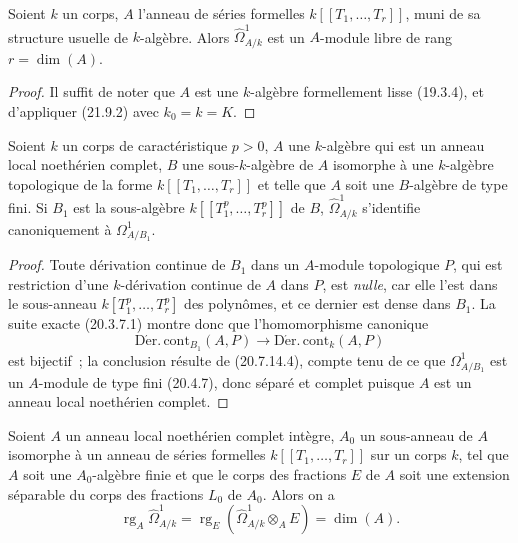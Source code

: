 \begin{corollary}[21.9.3]
\label{0.21.9.3-fr}
Soient $k$ un corps, $A$ l'anneau de séries formelles
$k[[T_1,\ldots,T_r]]$, muni de sa structure usuelle de $k$-algèbre. Alors
$\widehat\Omega^1_{A/k}$ est un $A$-module libre de rang $r=\dim(A)$.
\end{corollary}

\begin{proof}
Il suffit de noter que $A$ est une $k$-algèbre formellement lisse (19.3.4),
et d'appliquer (21.9.2) avec $k_0=k=K$.
\end{proof}

\begin{lemma}[21.9.4]
\label{0.21.9.4-fr}
Soient $k$ un corps de caractéristique $p>0$, $A$ une $k$-algèbre qui est un
anneau local noethérien complet, $B$ une sous-$k$-algèbre de $A$ isomorphe à
une $k$-algèbre topologique de la forme $k[[T_1,\ldots,T_r]]$ et telle que
$A$ soit une $B$-algèbre de type fini. Si $B_1$ est la sous-algèbre
$k[[T_1^p,\ldots,T_r^p]]$ de $B$, $\widehat\Omega^1_{A/k}$ s'identifie
canoniquement à $\Omega^1_{A/B_1}$.
\end{lemma}

\begin{proof}
Toute dérivation continue de $B_1$ dans un $A$-module topologique $P$, qui
est restriction d'une $k$-dérivation continue de $A$ dans $P$, est \emph{nulle},
car elle l'est dans le sous-anneau $k[T_1^p,\ldots,T_r^p]$ des polynômes, et
ce dernier est dense dans $B_1$. La suite exacte (20.3.7.1) montre donc que
l'homomorphisme canonique
\[
  \operatorname{D\acute{e}r.\,cont}_{B_1}(A,P)
  \longrightarrow \operatorname{D\acute{e}r.\,cont}_k(A,P)
\]
est bijectif~; la conclusion résulte de (20.7.14.4), compte tenu de ce que
$\Omega^1_{A/B_1}$ est un $A$-module de type fini (20.4.7), donc séparé et
complet puisque $A$ est un anneau local noethérien complet.
\end{proof}

\begin{proposition}[21.9.5]
\label{0.21.9.5-fr}
Soient $A$ un anneau local noethérien complet intègre, $A_0$ un sous-anneau
de $A$ isomorphe à un anneau de séries formelles $k[[T_1,\ldots,T_r]]$ sur
un corps $k$, tel que $A$ soit une $A_0$-algèbre finie et que le corps des
fractions $E$ de $A$ soit une extension séparable du corps des fractions
$L_0$ de $A_0$. Alors on a
\begin{equation}
\tag{21.9.5.1}
\label{0.21.9.5.1-fr}
  \operatorname{rg}_A\widehat\Omega^1_{A/k}
  =\operatorname{rg}_E(\widehat\Omega^1_{A/k}\otimes_AE)=\dim(A).
\end{equation}
\end{proposition}

